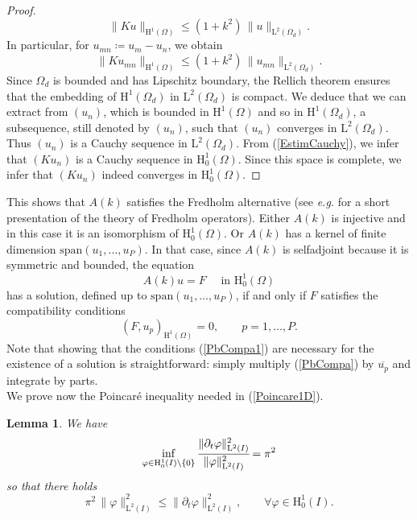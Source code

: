 \documentclass[11pt,a4paper]{report}
\newcommand{\Om}{\Omega}
\newcommand{\mrm}[1]{\mathrm{#1}}
\newcommand{\mL}{\mrm{L}}
\newcommand{\mH}{\mrm{H}}
\newtheorem{lemma}[theorem]{Lemma}
\begin{document}
\begin{proof}
\[
\|Ku\|_{\mH^1(\Om)} \le (1+k^2)\,\|u\|_{\mL^2(\Om_d)}. 
\]
In particular, for $u_{mn}\coloneqq u_m-u_n$, we obtain
\begin{equation}\label{EstimCauchy}
\|Ku_{mn}\|_{\mH^1(\Om)} \le (1+k^2)\,\|u_{mn}\|_{\mL^2(\Om_d)}. 
\end{equation}
Since $\Om_d$ is bounded and has Lipschitz boundary, the Rellich theorem ensures that the embedding of $\mH^1(\Om_d)$ in $\mL^2(\Om_d)$ is compact. We deduce that we can extract from  $(u_n)$, which is bounded in $\mH^1(\Om)$ and so in $\mH^1(\Om_d)$, a subsequence, still denoted by $(u_n)$, such that $(u_n)$ converges in $\mL^2(\Om_d)$. Thus $(u_n)$ is a Cauchy sequence in $\mL^2(\Om_d)$. From (\ref{EstimCauchy}), we infer that $(Ku_n)$ is a Cauchy sequence in $\mH^1_0(\Om)$. Since this space is complete, we infer that $(Ku_n)$ indeed converges in $\mH^1_0(\Om)$.
\end{proof}
\noindent This shows that $A(k)$ satisfies the Fredholm alternative (see \textit{e.g.} \cite[Chap.\,12]{Wlok87} for a short presentation of the theory of Fredholm operators). Either $A(k)$ is injective and in this case it is an isomorphism of $\mH^1_0(\Om)$. Or $A(k)$ has a kernel of finite dimension $\mrm{span}(u_1,\dots,u_P)$. In that case, since $A(k)$ is selfadjoint because it is symmetric and bounded, the equation 
\begin{equation}\label{PbCompa}
A(k)u=F\quad\mbox{ in }\mH^1_0(\Om)
\end{equation}
has a solution, defined up to $\mrm{span}(u_1,\dots,u_P)$, if and only if $F$ satisfies the compatibility conditions 
\begin{equation}\label{PbCompa1}
(F,u_p)_{\mH^1(\Om)}=0,\qquad p=1,\dots,P.
\end{equation}
Note that showing that the conditions (\ref{PbCompa1}) are necessary for the existence of a solution is straightforward: simply multiply (\ref{PbCompa}) by $\overline{u_p}$ and integrate by parts.\\
\newline
We prove now the Poincar\'e inequality needed in (\ref{Poincare1D}). 
\begin{lemma}\label{LemmaPoincare}
We have 
\begin{equation}\label{EstimatePoinc1D0}
\inf_{\varphi\in\mH^1_0(I)\setminus\{0\}} \cfrac{\|\partial_t\varphi\|^2_{\mL^2(I)}}{\|\varphi\|^2_{\mL^2(I)}}=\pi^2
\end{equation}
so that there holds
\begin{equation}\label{EstimatePoinc1D}
\pi^2\,\|\varphi\|^2_{\mL^2(I)}\le \|\partial_t\varphi\|^2_{\mL^2(I)},\qquad\forall \varphi\in\mH^1_0(I).
\end{equation}
\end{lemma}
\end{document}
